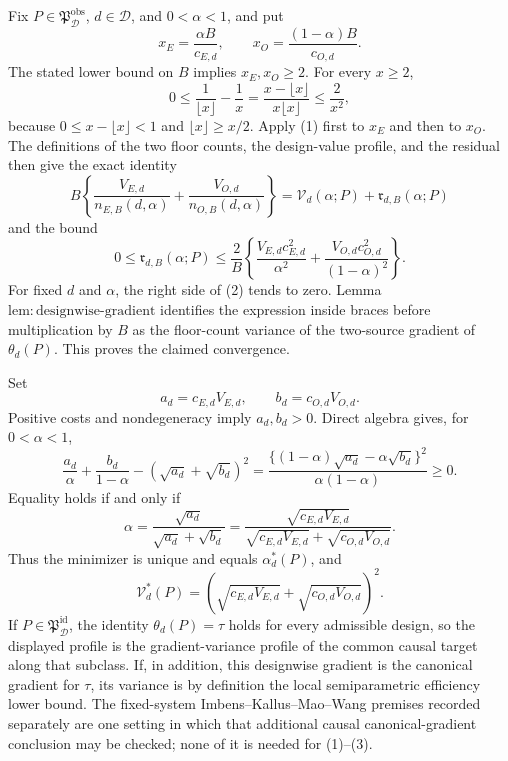 Fix \(P\in\mathfrak P_{\mathcal D}^{\mathrm{obs}}\), \(d\in\mathcal D\), and \(0<\alpha<1\), and put
\[
 x_E=\frac{\alpha B}{c_{E,d}},
 \qquad
 x_O=\frac{(1-\alpha)B}{c_{O,d}}.
\]
The stated lower bound on \(B\) implies \(x_E,x_O\ge2\).  For every \(x\ge2\),
\[
 0\le \frac1{\lfloor x\rfloor}-\frac1x
 =\frac{x-\lfloor x\rfloor}{x\lfloor x\rfloor}
 \le\frac2{x^2},                                           \tag{1}
\]
because \(0\le x-\lfloor x\rfloor<1\) and \(\lfloor x\rfloor\ge x/2\).  Apply (1) first to \(x_E\) and then to \(x_O\).  The definitions of the two floor counts, the design-value profile, and the residual then give the exact identity
\[
 B\left\{\frac{V_{E,d}}{n_{E,B}(d,\alpha)}
 +\frac{V_{O,d}}{n_{O,B}(d,\alpha)}\right\}
 =\mathcal V_d(\alpha;P)+\mathfrak r_{d,B}(\alpha;P)
\]
and the bound
\[
 0\le\mathfrak r_{d,B}(\alpha;P)
 \le\frac2B\left\{
 \frac{V_{E,d}c_{E,d}^2}{\alpha^2}
 +\frac{V_{O,d}c_{O,d}^2}{(1-\alpha)^2}\right\}.       \tag{2}
\]
For fixed \(d\) and \(\alpha\), the right side of (2) tends to zero.  Lemma~\(\mathrm{lem{:}designwise\text{-}gradient}\) identifies the expression inside braces before multiplication by \(B\) as the floor-count variance of the two-source gradient of \(\theta_d(P)\).  This proves the claimed convergence.

Set
\[
 a_d=c_{E,d}V_{E,d},
 \qquad
 b_d=c_{O,d}V_{O,d}.
\]
Positive costs and nondegeneracy imply \(a_d,b_d>0\).  Direct algebra gives, for \(0<\alpha<1\),
\[
 \frac{a_d}{\alpha}+\frac{b_d}{1-\alpha}
 -(\sqrt{a_d}+\sqrt{b_d})^2
 =\frac{\{(1-\alpha)\sqrt{a_d}-\alpha\sqrt{b_d}\}^2}
 {\alpha(1-\alpha)}\ge0.                                  \tag{3}
\]
Equality holds if and only if
\[
 \alpha
 =\frac{\sqrt{a_d}}{\sqrt{a_d}+\sqrt{b_d}}
 =\frac{\sqrt{c_{E,d}V_{E,d}}}
 {\sqrt{c_{E,d}V_{E,d}}+\sqrt{c_{O,d}V_{O,d}}}.
\]
Thus the minimizer is unique and equals \(\alpha_d^*(P)\), and
\[
 \mathcal V_d^*(P)
 =(\sqrt{c_{E,d}V_{E,d}}+\sqrt{c_{O,d}V_{O,d}})^2.
\]
If \(P\in\mathfrak P_{\mathcal D}^{\mathrm{id}}\), the identity \(\theta_d(P)=\tau\) holds for every admissible design, so the displayed profile is the gradient-variance profile of the common causal target along that subclass.  If, in addition, this designwise gradient is the canonical gradient for \(\tau\), its variance is by definition the local semiparametric efficiency lower bound.  The fixed-system Imbens--Kallus--Mao--Wang premises recorded separately are one setting in which that additional causal canonical-gradient conclusion may be checked; none of it is needed for (1)--(3).
